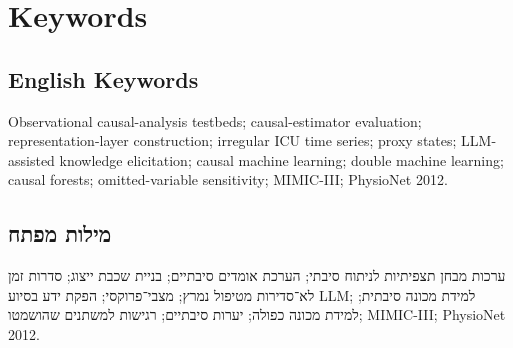 \chapter*{Keywords}

\section*{English Keywords}
Observational causal-analysis testbeds; causal-estimator evaluation; representation-layer construction; irregular ICU time series; proxy states; LLM-assisted knowledge elicitation; causal machine learning; double machine learning; causal forests; omitted-variable sensitivity; MIMIC-III; PhysioNet 2012.

\section*{\texthebrew{מילות מפתח}}
\begin{hebrew}
ערכות מבחן תצפיתיות לניתוח סיבתי; הערכת אומדים סיבתיים; בניית שכבת ייצוג; סדרות זמן לא־סדירות מטיפול נמרץ; מצבי־פרוקסי; הפקת ידע בסיוע \textenglish{LLM}; למידת מכונה סיבתית; למידת מכונה כפולה; יערות סיבתיים; רגישות למשתנים שהושמטו; \textenglish{MIMIC-III}; \textenglish{PhysioNet 2012}.
\end{hebrew}
